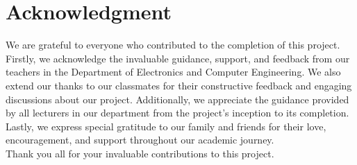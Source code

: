 




















\usepackage{array}



\KECcoverpage
\KECtitlepage
\KECapproval
{}


\chapter*{Acknowledgment}
We are grateful to everyone who contributed to the completion of this project. Firstly, we acknowledge the invaluable guidance, support, and feedback from our teachers in the Department of Electronics and Computer Engineering. We also extend our thanks to our classmates for their constructive feedback and engaging discussions about our project. Additionally, we appreciate the guidance provided by all lecturers in our department from the project's inception to its completion. Lastly, we express special gratitude to our family and friends for their love, encouragement, and support throughout our academic journey.\\
Thank you all for your invaluable contributions to this project.\\
\\
\\
\\


